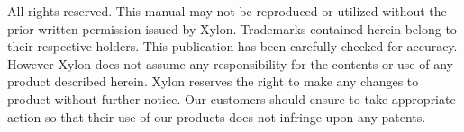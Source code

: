 \-All rights reserved. \-This manual may not be reproduced or utilized without the prior written permission issued by \-Xylon. \-Trademarks contained herein belong to their respective holders. \-This publication has been carefully checked for accuracy. \-However \-Xylon does not assume any responsibility for the contents or use of any product described herein. \-Xylon reserves the right to make any changes to product without further notice. \-Our customers should ensure to take appropriate action so that their use of our products does not infringe upon any patents. 